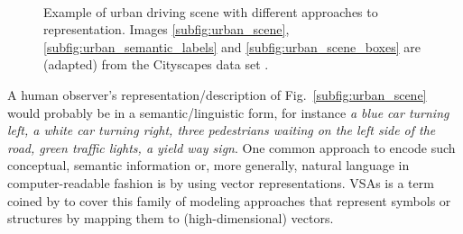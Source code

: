 \begin{figure}[t!]
	\centering
	\\
	\caption{Example of urban driving scene with different approaches to representation. Images \ref{subfig:urban_scene}, \ref{subfig:urban_semantic_labels} and \ref{subfig:urban_scene_boxes} are (adapted) from the Cityscapes data set \parencite{Cordts2016}.}
    \label{fig:urban_scene}
\end{figure}
A human observer's representation/description of Fig.~\ref{subfig:urban_scene} would probably be in a semantic/linguistic form, for instance \emph{a blue car turning left, a white car turning right, three pedestrians waiting on the left side of the road, green traffic lights, a yield way sign}.
One common approach to encode such conceptual, semantic information or, more generally, natural language in computer-readable fashion is by using vector representations.
\acfp{VSA} is a term coined by \textcite{Gayler2003} to cover this family of modeling approaches that represent symbols or structures by mapping them to (high-dimensional) vectors.

